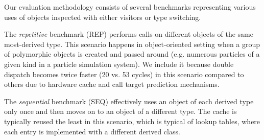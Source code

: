 
Our evaluation methodology consists of several benchmarks representing various 
uses of objects inspected with either visitors or type switching.

The \emph{repetitive} benchmark (REP) performs calls on different objects of the 
same most-derived type. This scenario happens in object-oriented setting when a 
group of polymorphic objects is created and passed around (e.g. numerous 
particles of a given kind in a particle simulation system). We include it 
because double dispatch becomes twice faster (20 vs. 53 cycles) in this 
scenario compared to others due to hardware cache and call target prediction mechanisms. 

The \emph{sequential} benchmark (SEQ) effectively uses an object of each derived type only 
once and then moves on to an object of a different type. The cache is typically 
reused the least in this scenario, which is typical of lookup tables, where each 
entry is implemented with a different derived class.

